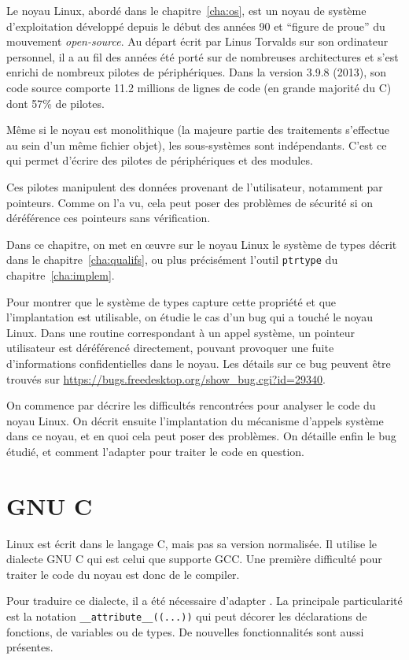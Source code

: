 Le noyau Linux, abordé dans le chapitre~\ref{cha:os}, est un noyau de système
d'exploitation développé depuis le début des années 90 et \enquote{figure de
proue} du mouvement \emph{open-source}. Au départ écrit par Linus Torvalds sur
son ordinateur personnel, il a au fil des années été porté sur de nombreuses
architectures et s'est enrichi de nombreux pilotes de périphériques. Dans la
version 3.9.8 (2013), son code source comporte 11.2 millions de lignes de code
(en grande majorité du C) dont 57\% de pilotes.

Même si le noyau est monolithique (la majeure partie des traitements s'effectue
au sein d'un même fichier objet), les sous-systèmes sont indépendants. C'est ce
qui permet d'écrire des pilotes de périphériques et des modules.

Ces pilotes manipulent des données provenant de l'utilisateur, notamment par
pointeurs. Comme on l'a vu, cela peut poser des problèmes de sécurité si on
déréférence ces pointeurs sans vérification.

Dans ce chapitre, on met en œuvre sur le noyau Linux le système de types décrit
dans le chapitre~\ref{cha:qualifs}, ou plus précisément l'outil \texttt{ptrtype}
du chapitre~\ref{cha:implem}.

Pour montrer que le système de types capture cette propriété et que
l'implantation est utilisable, on étudie le cas d'un bug qui a touché le noyau
Linux. Dans une routine correspondant à un appel système, un pointeur
utilisateur est déréférencé directement, pouvant provoquer une fuite
d'informations confidentielles dans le noyau. Les détails sur ce bug peuvent
être trouvés sur \url{https://bugs.freedesktop.org/show_bug.cgi?id=29340}.

On commence par décrire les difficultés rencontrées pour analyser le code du
noyau Linux. On décrit ensuite l'implantation du mécanisme d'appels système dans
ce noyau, et en quoi cela peut poser des problèmes. On détaille enfin le bug
étudié, et comment l'adapter pour traiter le code en question.

\section{GNU C}
\label{sec:gnuc}

Linux est écrit dans le langage C, mais pas sa version normalisée. Il utilise le
dialecte GNU C qui est celui que supporte GCC. Une première difficulté pour
traiter le code du noyau est donc de le compiler.

Pour traduire ce dialecte, il a été nécessaire d'adapter \ctonewspeak. La
principale particularité est la notation \verb!__attribute__((...))! qui peut
décorer les déclarations de fonctions, de variables ou de types. De nouvelles
fonctionnalités sont aussi présentes.

